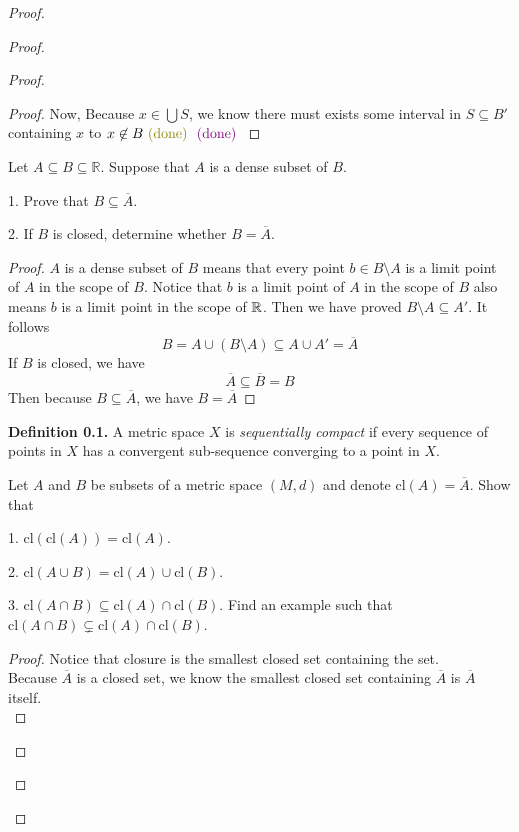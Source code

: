 \documentclass{report}
\begin{document}
\begin{proof}
\begin{proof}
\begin{proof}
\begin{proof}
Now, Because $x\in \bigcup S$, we know there must exists some interval in $S\subseteq B'$ containing  $x$  \CaC to $x\not\in B\odone\vdone$
\end{proof}
\begin{question}{}{}
Let \( A \subseteq B \subseteq \mathbb{R} \). Suppose that \( A \) is a dense subset of \( B \).

1. Prove that \( B \subseteq \overline{A} \).

2. If \( B \) is closed, determine whether \( B = \overline{A} \).
\end{question}
\begin{proof}
$A$ is a dense subset of $B$ means that every point $b\in B\setminus A$ is a limit point of $A$ in the scope of $B$. Notice that $b$ is a limit point of  $A$ in the scope of $B$ also means $b$ is a limit point in the scope of $\mathbb{R}$. Then we have proved $B\setminus A\subseteq A'$. It follows
\begin{equation}
B=A \cup (B\setminus A)\subseteq A\cup A'=\overline{A}
\end{equation}
If $B$ is closed, we have
 \begin{equation}
\overline{A}\subseteq \overline{B}=B
\end{equation}
Then because $B\subseteq \overline{A}$, we have $B=\overline{A}$



\end{proof}
\textbf{Definition 0.1.} A metric space \( X \) is \textit{sequentially compact} if every sequence of points in \( X \) has a convergent sub-sequence converging to a point in \( X \).
\begin{question}{}{}

Let \( A \) and \( B \) be subsets of a metric space \( (M, d) \) and denote \( \text{cl}(A) = \overline{A} \). Show that

1. \( \text{cl}(\text{cl}(A)) = \text{cl}(A) \).

2. \( \text{cl}(A \cup B) = \text{cl}(A) \cup \text{cl}(B) \).

3. \( \text{cl}(A \cap B) \subseteq \text{cl}(A) \cap \text{cl}(B) \). Find an example such that \( \text{cl}(A \cap B) \subsetneq \text{cl}(A) \cap \text{cl}(B) \).
\end{question}
\begin{proof}
Notice that closure is the smallest closed set containing the set.\\

Because $\overline{A}$ is a closed set, we know the smallest closed set containing $\overline{A}$ is $\overline{A}$ itself.\\


\end{proof}
\end{proof}
\end{proof}
\end{proof}
\end{document}
